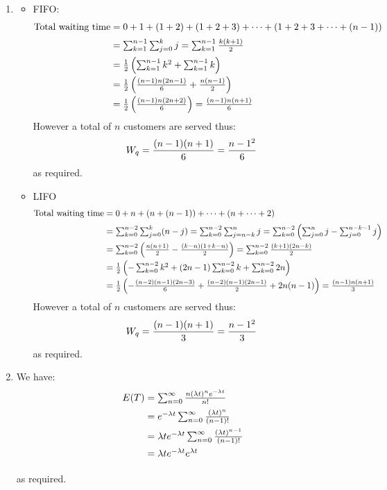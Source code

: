 \documentclass[12pt]{article}
\begin{document}
\begin{enumerate}
\item
    \begin{itemize}
        \item FIFO:
        $$\begin{array}{@{}r@{\;}c@{\;}l@{}}
        \text{Total waiting time}&=&0+1+(1+2)+(1+2+3)+\dots+(1+2+3+\dots+(n-1))\\[2mm]
                                 &=&\sum_{k=1}^{n-1}\sum_{j=0}^kj=\sum_{k=1}^{n-1}{k(k+1)\over2}\\[2mm]
                                 &=&{1\over2}\left(\sum_{k=1}^{n-1}k^2+\sum_{k=1}^{n-1}k\right)\\[2mm]
                                 &=&{1\over2}\left({(n-1)n(2n-1)\over 6}+{n(n-1)\over2}\right)\\[2mm]
                                 &=&{1\over2}\left({(n-1)n(2n+2)\over 6}\right)={(n-1)n(n+1)\over 6}
        \end{array}$$
        However a total of $n$ customers are served thus:
        $$W_q={(n-1)(n+1)\over 6}={n-1^2\over 6}$$ as required.
        \item LIFO
         $$\begin{array}{@{}r@{\;}c@{\;}l@{}}
        \text{Total waiting time}&=&0+n+(n+(n-1))+\dots+(n+\dots+2)\\[2mm]
                                 &=&\sum_{k=0}^{n-2}\sum_{j=0}^k(n-j)=\sum_{k=0}^{n-2}\sum_{j=n-k}^nj=\sum_{k=0}^{n-2}\left(\sum_{j=0}^nj-\sum_{j=0}^{n-k-1}j\right)\\[2mm]
                                 &=&\sum_{k=0}^{n-2}\left({n(n+1)\over2}-{(k-n)(1+k-n)\over2}\right)=\sum_{k=0}^{n-2}{(k+1)(2n-k)\over2}\\[2mm]
                                 &=&{1\over2}\left(-\sum_{k=0}^{n-2}k^2+(2n-1)\sum_{k=0}^{n-2}k+\sum_{k=0}^{n-2}2n\right)\\[2mm]
                                 &=&{1\over2}\left(-{(n-2)(n-1)(2n-3)\over6}+{(n-2)(n-1)(2n-1)\over2}+2n(n-1)\right)={(n-1)n(n+1)\over 3}
        \end{array}$$
        However a total of $n$ customers are served thus:
        $$W_q={(n-1)(n+1)\over 3}={n-1^2\over 3}$$ as required.
    \end{itemize}


\item We have:
$$\begin{array}{@{}r@{\;}c@{\;}l@{}}
E(T)&=&\sum_{n=0}^\infty{n(\lambda t)^ne^{-\lambda t}\over n!}\\[2mm]
    &=&e^{-\lambda t}\sum_{n=0}^\infty{(\lambda t)^n\over (n-1)!}\\[2mm]
    &=&\lambda te^{-\lambda t}\sum_{n=0}^\infty{(\lambda t)^{n-1}\over (n-1)!}\\[2mm]
    &=&\lambda te^{-\lambda t}e^{\lambda t}\\[2mm]
\end{array}$$
  as required.\\


\end{enumerate}
\end{document}
